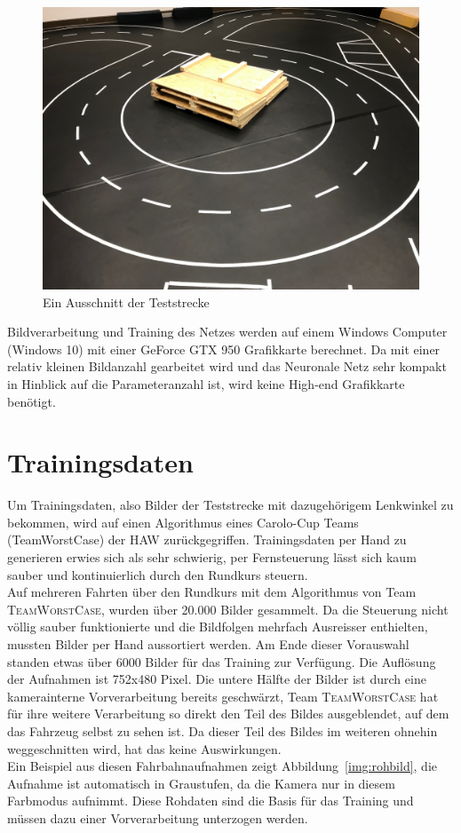 \begin{figure}[h]
	\centering
	\includegraphics[scale=0.2]{figures/Teststrecke-Ausschnitt.jpg}
	\caption{Ein Ausschnitt der Teststrecke}
	\label{img:teststrecke}
\end{figure}

Bildverarbeitung und Training des Netzes werden auf einem Windows Computer (Windows 10) mit einer GeForce GTX 950 Grafikkarte berechnet. Da mit einer relativ kleinen Bildanzahl gearbeitet wird und das Neuronale Netz sehr kompakt in Hinblick auf die Parameteranzahl ist, wird keine High-end Grafikkarte benötigt.


\section{Trainingsdaten}

Um Trainingsdaten, also Bilder der Teststrecke mit dazugehörigem Lenkwinkel zu bekommen, wird auf einen Algorithmus eines Carolo-Cup Teams (TeamWorstCase) der HAW zurückgegriffen. Trainingsdaten per Hand zu generieren erwies sich als sehr schwierig, per Fernsteuerung lässt sich kaum sauber und kontinuierlich durch den Rundkurs steuern.\\
Auf mehreren Fahrten über den Rundkurs mit dem Algorithmus von Team \textsc{TeamWorstCase}, wurden über 20.000 Bilder gesammelt. Da die Steuerung nicht völlig sauber funktionierte und die Bildfolgen mehrfach Ausreisser enthielten, mussten Bilder per Hand aussortiert werden. Am Ende dieser Vorauswahl standen etwas über 6000 Bilder für das Training zur Verfügung. Die Auflösung der Aufnahmen ist 752x480 Pixel. Die untere Hälfte der Bilder ist durch eine kamerainterne Vorverarbeitung bereits geschwärzt, Team \textsc{TeamWorstCase} hat für ihre weitere Verarbeitung so direkt den Teil des Bildes ausgeblendet, auf dem das Fahrzeug selbst zu sehen ist. Da dieser Teil des Bildes im weiteren ohnehin weggeschnitten wird, hat das keine Auswirkungen. \\
Ein Beispiel aus diesen Fahrbahnaufnahmen zeigt Abbildung~\ref{img:rohbild}, die Aufnahme ist automatisch in Graustufen, da die Kamera nur in diesem Farbmodus aufnimmt.
Diese Rohdaten sind die Basis für das Training und müssen dazu einer Vorverarbeitung unterzogen werden. 

